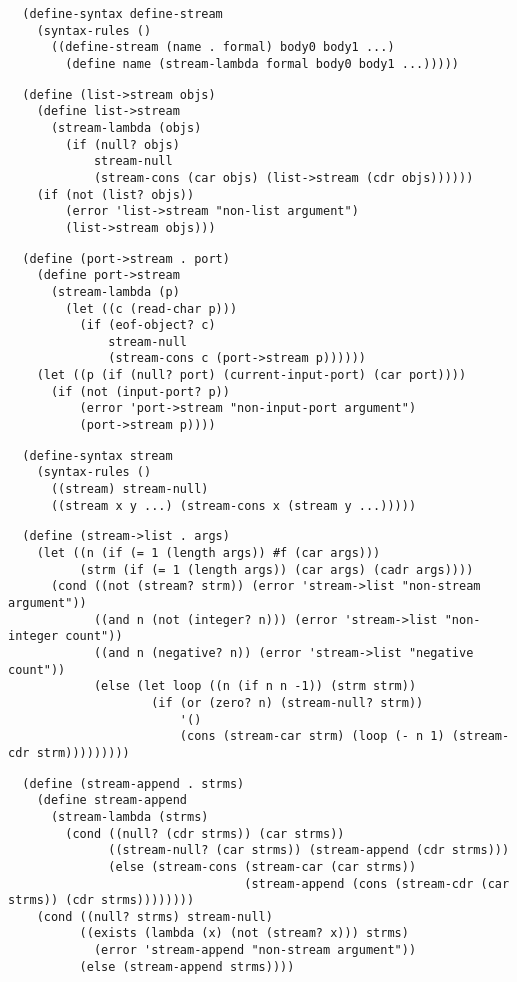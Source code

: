 \begin{verbatim}
  (define-syntax define-stream
    (syntax-rules ()
      ((define-stream (name . formal) body0 body1 ...)
        (define name (stream-lambda formal body0 body1 ...)))))
\end{verbatim}

\begin{verbatim}
  (define (list->stream objs)
    (define list->stream
      (stream-lambda (objs)
        (if (null? objs)
            stream-null
            (stream-cons (car objs) (list->stream (cdr objs))))))
    (if (not (list? objs))
        (error 'list->stream "non-list argument")
        (list->stream objs)))
\end{verbatim}

\begin{verbatim}
  (define (port->stream . port)
    (define port->stream
      (stream-lambda (p)
        (let ((c (read-char p)))
          (if (eof-object? c)
              stream-null
              (stream-cons c (port->stream p))))))
    (let ((p (if (null? port) (current-input-port) (car port))))
      (if (not (input-port? p))
          (error 'port->stream "non-input-port argument")
          (port->stream p))))
\end{verbatim}

\begin{verbatim}
  (define-syntax stream
    (syntax-rules ()
      ((stream) stream-null)
      ((stream x y ...) (stream-cons x (stream y ...)))))
\end{verbatim}

\begin{verbatim}
  (define (stream->list . args)
    (let ((n (if (= 1 (length args)) #f (car args)))
          (strm (if (= 1 (length args)) (car args) (cadr args))))
      (cond ((not (stream? strm)) (error 'stream->list "non-stream argument"))
            ((and n (not (integer? n))) (error 'stream->list "non-integer count"))
            ((and n (negative? n)) (error 'stream->list "negative count"))
            (else (let loop ((n (if n n -1)) (strm strm))
                    (if (or (zero? n) (stream-null? strm))
                        '()
                        (cons (stream-car strm) (loop (- n 1) (stream-cdr strm)))))))))
\end{verbatim}

\begin{verbatim}
  (define (stream-append . strms)
    (define stream-append
      (stream-lambda (strms)
        (cond ((null? (cdr strms)) (car strms))
              ((stream-null? (car strms)) (stream-append (cdr strms)))
              (else (stream-cons (stream-car (car strms))
                                 (stream-append (cons (stream-cdr (car strms)) (cdr strms))))))))
    (cond ((null? strms) stream-null)
          ((exists (lambda (x) (not (stream? x))) strms)
            (error 'stream-append "non-stream argument"))
          (else (stream-append strms))))
\end{verbatim}

